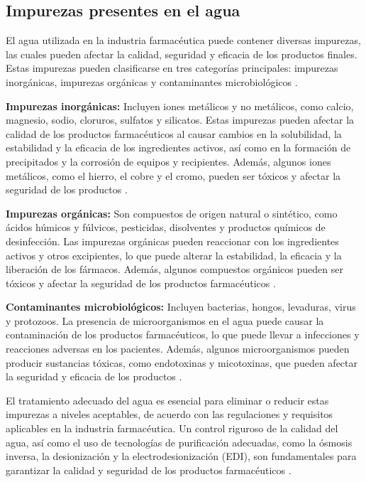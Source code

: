 \subsection{Impurezas presentes en el agua}

El agua utilizada en la industria farmacéutica puede contener diversas impurezas, las cuales pueden afectar la calidad, seguridad y eficacia 
de los productos finales. Estas impurezas pueden clasificarse en tres categorías principales: impurezas inorgánicas,
 impurezas orgánicas y contaminantes microbiológicos \cite{luiscarrascoQueTipoImpurezas2021}.

\textbf{Impurezas inorgánicas: }Incluyen iones metálicos y no metálicos, como calcio, magnesio, sodio, 
cloruros, sulfatos y silicatos. Estas impurezas pueden afectar la calidad de los productos farmacéuticos
 al causar cambios en la solubilidad, la estabilidad y la eficacia de los ingredientes activos, así 
 como en la formación de precipitados y la corrosión de equipos y recipientes. Además, algunos iones 
 metálicos, como el hierro, el cobre y el cromo, pueden ser tóxicos y afectar la seguridad de los productos \cite{elgalabwaterImpactoCompuestosInorganicos2018}.

\textbf{Impurezas orgánicas: }Son compuestos de origen natural o sintético, como ácidos húmicos y 
fúlvicos, pesticidas, disolventes y productos químicos de desinfección. Las impurezas orgánicas pueden 
reaccionar con los ingredientes activos y otros excipientes, lo que puede alterar la estabilidad, la eficacia
 y la liberación de los fármacos. Además, algunos compuestos orgánicos pueden ser tóxicos y afectar la 
 seguridad de los productos farmacéuticos \cite{elgalabwaterImpactoCompuestosOrganicos2018}.

\textbf{Contaminantes microbiológicos:} Incluyen bacterias, hongos, levaduras, virus y protozoos. 
La presencia de microorganismos en el agua puede causar la contaminación de los productos farmacéuticos, 
lo que puede llevar a infecciones y reacciones adversas en los pacientes. Además, algunos microorganismos 
pueden producir sustancias tóxicas, como endotoxinas y micotoxinas, que pueden afectar la seguridad y eficacia de los productos \cite{mireyadelpilararcospulidoIndicadoresMicrobiologicosContaminacion2015}.

El tratamiento adecuado del agua es esencial para eliminar o reducir estas impurezas a niveles aceptables, 
de acuerdo con las regulaciones y requisitos aplicables en la industria farmacéutica. Un control riguroso de la calidad
 del agua, así como el uso de tecnologías de purificación adecuadas, como la ósmosis inversa, la desionización y la 
 electrodesionización (EDI), son fundamentales para garantizar la calidad y seguridad de los productos farmacéuticos .
